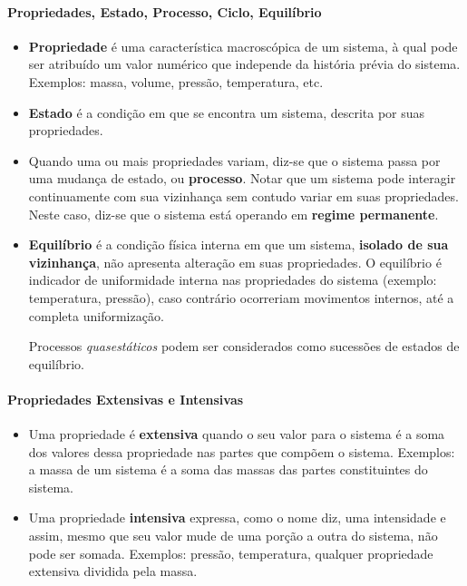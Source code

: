 \documentclass[a4paper, 12pt]{article}
\begin{document}
\paragraph{Propriedades, Estado, Processo, Ciclo, Equilíbrio} 
	\begin{itemize}
		\item \textbf{Propriedade} é uma característica macroscópica de um sistema, à qual pode
		ser atribuído um valor numérico que independe da história prévia do
		sistema. Exemplos: massa, volume, pressão, temperatura, etc.
		
		\item \textbf{Estado} é a condição em que se encontra um sistema, descrita por suas
		propriedades.
		
		\item Quando uma ou mais propriedades variam, diz-se que o sistema passa por
		uma mudança de estado, ou \textbf{processo}.
		Notar que um sistema pode interagir continuamente com sua vizinhança
		sem contudo variar em suas propriedades. Neste caso, diz-se que o sistema
		está operando em \textbf{regime permanente}.
		
		\item \textbf{Equilíbrio} é a condição física interna em que um sistema, \textbf{isolado de sua
		vizinhança}, não apresenta alteração em suas propriedades. O equilíbrio é
		indicador de uniformidade interna nas propriedades do sistema
		(exemplo: temperatura, pressão), caso contrário ocorreriam movimentos
		internos, até a completa uniformização.
		
		Processos \textit{quasestáticos} podem ser considerados como sucessões de estados de equilíbrio.
	\end{itemize}

\paragraph{Propriedades Extensivas e Intensivas}
	\begin{itemize}
		\item Uma propriedade é \textbf{extensiva} quando o seu valor para
		o sistema é a soma dos valores dessa propriedade nas
		partes que compõem o sistema. Exemplos: a massa de
		um sistema é a soma das massas das partes
		constituintes do sistema.
		
		\item Uma propriedade \textbf{intensiva} expressa, como o nome
		diz, uma intensidade e assim, mesmo que seu valor
		mude de uma porção a outra do sistema, não pode
		ser somada. Exemplos: pressão, temperatura,
		qualquer propriedade extensiva dividida pela massa.
	\end{itemize}
\end{document}
